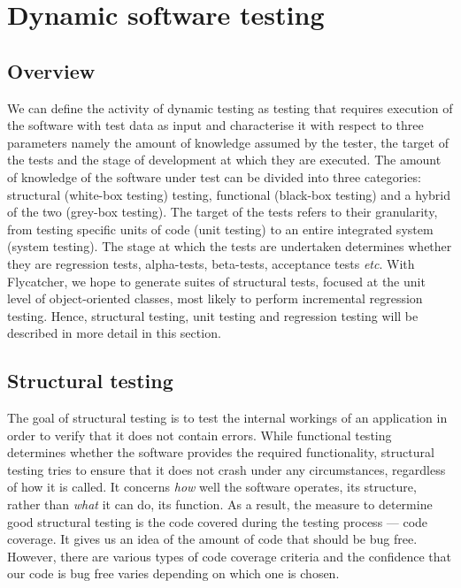 \documentclass[a4paper,11pt,titlepage]{report}
\begin{document}
\section{Dynamic software testing}

\subsection{Overview}

We can define the activity of dynamic testing as testing that requires execution of the software with test data as input \cite{mahmood2007systematic} and characterise it with respect to three parameters namely the amount of knowledge assumed by the tester, the target of the tests and the stage of development at which they are executed. The amount of knowledge of the software under test can be divided into three categories: structural (white-box testing) testing, functional (black-box testing) and a hybrid of the two (grey-box testing). The target of the tests refers to their granularity, from testing specific units of code (unit testing) to an entire integrated system (system testing). The stage at which the tests are undertaken determines whether they are regression tests, alpha-tests, beta-tests, acceptance tests \emph{etc}. With \textsf{Flycatcher}, we hope to generate suites of structural tests, focused at the unit level of object-oriented classes, most likely to perform incremental regression testing. Hence, structural testing, unit testing and regression testing will be described in more detail in this section.

\subsection{Structural testing}

The goal of structural testing is to test the internal workings \cite{mcminn2004search} of an application in order to verify that it does not contain errors. While functional testing determines whether the software provides the required functionality, structural testing tries to ensure that it does not crash under any circumstances, regardless of how it is called. It concerns \emph{how} well the software operates, its structure, rather than \emph{what} it can do, its function. As a result, the measure to determine good structural testing is the code covered during the testing process --- code coverage. It gives us an idea of the amount of code that should be bug free. However, there are various types of code coverage criteria and the confidence that our code is bug free varies depending on which one is chosen.
\end{document}
